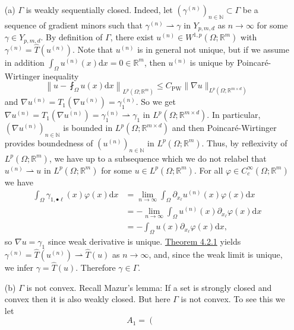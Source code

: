 \begin{itemize}
	\item[(a)] $\Gamma$ is weakly sequentially closed. Indeed, let $(\gamma^{(n)})_{n\in\mathbb{N}}\subset\Gamma$ be a sequence of gradient minors such that $\gamma^{(n)}\rightharpoonup\gamma$ in $Y_{p,m,d}$ as $n\to\infty$ for some $\gamma\in Y_{p,m,d}$. By definition of $\Gamma$, there exist $u^{(n)}\in W^{1,p}(\Omega;\mathbb{R}^m)$ with $\gamma^{(n)}=\widehat{T}(u^{(n)})$. Note that $u^{(n)}$ is in general not unique, but if we assume in addition $\int_\Omega{u^{(n)}(x)\mathrm{d}x}=0\in\mathbb{R}^m$, then $u^{(n)}$ is unique by Poincar\'e-Wirtinger inequality
	\[\left\lVert u-\fint_\Omega{u(x)\mathrm{d}x}\right\rVert_{L^p(\Omega;\mathbb{R}^m)}\leq C_\text{PW}\lVert\nabla u\rVert_{L^p(\Omega;\mathbb{R}^{m\times d})}\]
	and $\nabla u^{(n)}=T_1(\nabla u^{(n)})=\gamma_1^{(n)}$. So we get $\nabla u^{(n)}=T_1(\nabla u^{(n)})=\gamma_1^{(n)}\rightharpoonup\gamma_1$ in $L^p(\Omega;\mathbb{R}^{m\times d})$. In particular, $(\nabla u^{(n)})_{n\in\mathbb{N}}$ is bounded in $L^p(\Omega;\mathbb{R}^{m\times d})$ and then Poincar\'e-Wirtinger provides boundedness of $(u^{(n)})_{n\in\mathbb{N}}$ in $L^p(\Omega;\mathbb{R}^m)$. Thus, by reflexivity of $L^p(\Omega;\mathbb{R}^m)$, we have up to a subsequence which we do not relabel that $u^{(n)}\rightharpoonup u$ in $L^p(\Omega;\mathbb{R}^m)$ for some $u\in L^p(\Omega;\mathbb{R}^m)$. For all $\varphi\in C_c^\infty(\Omega;\mathbb{R}^m)$ we have
	\begin{align*}
		\int_\Omega{\gamma_{1,\bullet\ell}(x)\varphi(x)\mathrm{d}x}&=\lim_{n\to\infty}{\int_\Omega{\partial_{x_\ell}u^{(n)}(x)\varphi(x)\mathrm{d}x}}\\
		&=-\lim_{n\to\infty}{\int_\Omega{u^{(n)}(x)\partial_{x_\ell}\varphi(x)\mathrm{d}x}}\\
		&=-\int_\Omega{u(x)\partial_{x_\ell}\varphi(x)\mathrm{d}x},
	\end{align*}
	so $\nabla u=\gamma_1$ since weak derivative is unique. \hyperlink{theorem_4_2_1}{Theorem 4.2.1} yields $\gamma^{(n)}=\widehat{T}(u^{(n)})\rightharpoonup\widehat{T}(u)$ as $n\to\infty$, and, since the weak limit is unique, we infer $\gamma=\widehat{T}(u)$. Therefore $\gamma\in\Gamma$.
	\item[(b)] $\Gamma$ is not convex. Recall Mazur's lemma: If a set is strongly closed and convex then it is also weakly closed. But here $\Gamma$ is not convex. To see this we let
	\[A_1=\left(\begin{array}{c|c}
		\begin{array}{cc}

\end{array}
\end{array}\]
\end{itemize}
